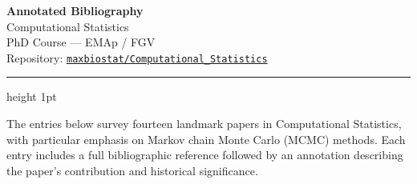 \documentclass[12pt, a4paper]{article}
\begin{document}
\begin{center}
  {\LARGE\bfseries\color{titlecolor} Annotated Bibliography}\\[0.4em]
  {\large Computational Statistics}\\[0.3em]
  {\small PhD Course --- EMAp / FGV\\
  Repository: \href{https://github.com/maxbiostat/Computational_Statistics}{\texttt{maxbiostat/Computational\_Statistics}}}
\end{center}

\vspace{0.5em}
\hrule height 1pt
\vspace{1.5em}

\noindent
The entries below survey fourteen landmark papers in Computational Statistics, with particular emphasis on Markov chain Monte Carlo (MCMC) methods.
Each entry includes a full bibliographic reference followed by an annotation describing the paper's contribution and historical significance.

\vspace{1em}
\end{document}
